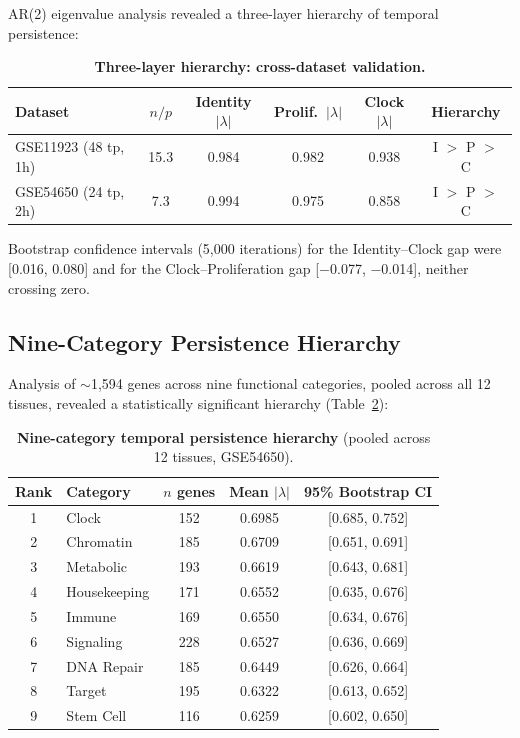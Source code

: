 \documentclass[11pt,a4paper]{article}
\begin{document}
AR(2) eigenvalue analysis revealed a three-layer hierarchy of temporal persistence:

\begin{table}[H]
\centering
\caption{\textbf{Three-layer hierarchy: cross-dataset validation.}}
\label{tab:hierarchy}
\begin{tabular}{lccccc}
\toprule
Dataset & $n/p$ & Identity $|\lambda|$ & Prolif.\ $|\lambda|$ & Clock $|\lambda|$ & Hierarchy \\
\midrule
GSE11923 (48 tp, 1h) & 15.3 & 0.984 & 0.982 & 0.938 & I $>$ P $>$ C \\
GSE54650 (24 tp, 2h) & 7.3 & 0.994 & 0.975 & 0.858 & I $>$ P $>$ C \\
\bottomrule
\end{tabular}
\end{table}

Bootstrap confidence intervals (5,000 iterations) for the Identity--Clock gap were [0.016, 0.080] and for the Clock--Proliferation gap [$-$0.077, $-$0.014], neither crossing zero.

\subsection{Nine-Category Persistence Hierarchy}

Analysis of $\sim$1,594 genes across nine functional categories, pooled across all 12 tissues, revealed a statistically significant hierarchy (Table~\ref{tab:ninecategory}):

\begin{table}[H]
\centering
\caption{\textbf{Nine-category temporal persistence hierarchy} (pooled across 12 tissues, GSE54650).}
\label{tab:ninecategory}
\begin{tabular}{clccc}
\toprule
\textbf{Rank} & \textbf{Category} & \textbf{$n$ genes} & \textbf{Mean $|\lambda|$} & \textbf{95\% Bootstrap CI} \\
\midrule
1 & Clock            & 152 & 0.6985 & [0.685, 0.752] \\
2 & Chromatin        & 185 & 0.6709 & [0.651, 0.691] \\
3 & Metabolic        & 193 & 0.6619 & [0.643, 0.681] \\
4 & Housekeeping     & 171 & 0.6552 & [0.635, 0.676] \\
5 & Immune           & 169 & 0.6550 & [0.634, 0.676] \\
6 & Signaling        & 228 & 0.6527 & [0.636, 0.669] \\
7 & DNA Repair       & 185 & 0.6449 & [0.626, 0.664] \\
8 & Target           & 195 & 0.6322 & [0.613, 0.652] \\
9 & Stem Cell        & 116 & 0.6259 & [0.602, 0.650] \\
\bottomrule
\end{tabular}
\end{table}
\end{document}
